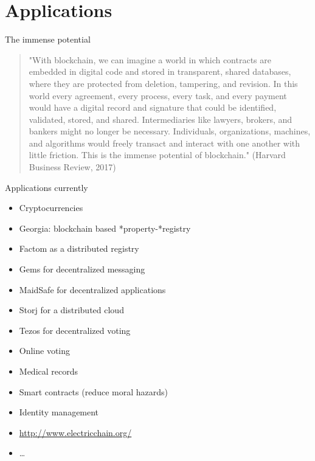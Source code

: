 \documentclass[presentation]{beamer}
\begin{document}
\section{Applications}
\label{sec-6}
\begin{frame}[label=sec-6-1]{The immense potential}
\begin{quotation}
"With blockchain, we can imagine a world in which contracts are embedded in
digital code and stored in transparent, shared databases, where they are
protected from deletion, tampering, and revision. In this world every agreement,
every process, every task, and every payment would have a digital record and
signature that could be identified, validated, stored, and shared.
Intermediaries like lawyers, brokers, and bankers might no longer be necessary.
Individuals, organizations, machines, and algorithms would freely transact and
interact with one another with little friction. This is the immense potential of
blockchain." (Harvard Business Review, 2017)
\end{quotation}
\end{frame}

\begin{frame}[label=sec-6-2]{Applications currently}
\begin{itemize}
\item Cryptocurrencies
\item Georgia: blockchain based *property-*registry
\item Factom as a \alert{distributed registry}
\item Gems for \alert{decentralized messaging}
\item MaidSafe for \alert{decentralized applications}
\item Storj for a \alert{distributed cloud}
\item Tezos for \alert{decentralized voting}
\item Online \alert{voting}
\item \alert{Medical records}
\item Smart contracts (reduce moral hazards)
\item Identity management
\item \url{http://www.electricchain.org/}
\item \ldots{}
\end{itemize}
\end{frame}
\end{document}

